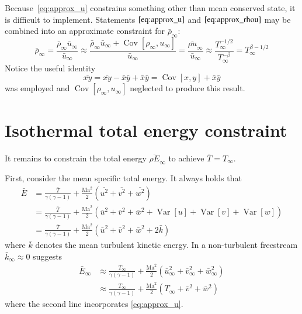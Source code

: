 \documentclass[letterpaper,11pt,nointlimits,reqno]{amsart}
\newcommand{\Mach}[1][]{\mbox{Ma}_{#1}}
\newcommand{\Cov}[2]{\ensuremath{\operatorname{Cov}\left[{#1},{#2}\right]}}
\newcommand{\Var}[1]{\ensuremath{\operatorname{Var}\left[{#1}\right]}}
\begin{document}
Because~\eqref{eq:approx_u} constrains something other than mean conserved
state, it is difficult to implement.  Statements $\eqref{eq:approx_u}$ and
$\eqref{eq:approx_rhou}$ may be combined into an approximate constraint for
$\bar{\rho}_\infty$:
\begin{equation}
  \label{eq:approx_rho}
  \bar{\rho}_\infty
  =
  \frac{\bar{\rho}_\infty \bar{u}_\infty}
       {\bar{u}_\infty}
  \approx
  \frac{\bar{\rho}_\infty \bar{u}_\infty + \Cov{\rho_\infty}{u_\infty}}
       {\bar{u}_\infty}
  =
  \frac{\overline{\rho u}_\infty}
       {\bar{u}_\infty}
  \approx
  \frac{T_\infty^{-1/2}}{T_\infty^{-\beta}}
  =
  T_\infty^{\beta-1/2}
\end{equation}
Notice the useful identity
\begin{equation}
  \label{eq:covxy}
  \overline{xy} = \overline{xy} - \bar{x} \bar{y} + \bar{x} \bar{y}
                = \Cov{x}{y} + \bar{x} \bar{y}
\end{equation}
was employed and $\Cov{\rho_\infty}{u_\infty}$ neglected to produce this
result.

\section{Isothermal total energy constraint}

It remains to constrain the total energy $\overline{\rho E}_\infty$ to achieve
$\bar{T}=T_\infty$.

First, consider the mean specific total energy.  It always holds that
\begin{align}
  \bar{E}
  &= \frac{\bar{T}}{\gamma\left( \gamma-1 \right)}
   + \frac{\Mach^2}{2}\left(\overline{u^2}+\overline{v^2}+\overline{w^2}\right)
\\
  &= \frac{\bar{T}}{\gamma\left( \gamma-1 \right)}
   + \frac{\Mach^2}{2}\left(\bar{u}^2+\bar{v}^2+\bar{w}^2
                            +\Var{u} +\Var{v} +\Var{w}\right)
\\
  &= \frac{\bar{T}}{\gamma\left( \gamma-1 \right)}
   + \frac{\Mach^2}{2}\left(\bar{u}^2+\bar{v}^2+\bar{w}^2+2\bar{k}\right)
\end{align}
where $\bar{k}$ denotes the mean turbulent kinetic energy.  In a non-turbulent
freestream $\bar{k}_\infty\approx{}0$ suggests
\begin{align}
  \bar{E}_\infty
  &\approx
     \frac{T_\infty}{\gamma\left(\gamma-1 \right)}
   + \frac{\Mach^2}{2}\left(\bar{u}_\infty^2+\bar{v}_\infty^2+\bar{w}_\infty^2\right)
\\
  \label{eq:approx_E}
  &\approx
     \frac{T_\infty}{\gamma\left(\gamma-1 \right)}
   + \frac{\Mach^2}{2}\left(T_\infty+\bar{v}^2+\bar{w}^2\right)
\end{align}
where the second line incorporates \eqref{eq:approx_u}.
\end{document}
